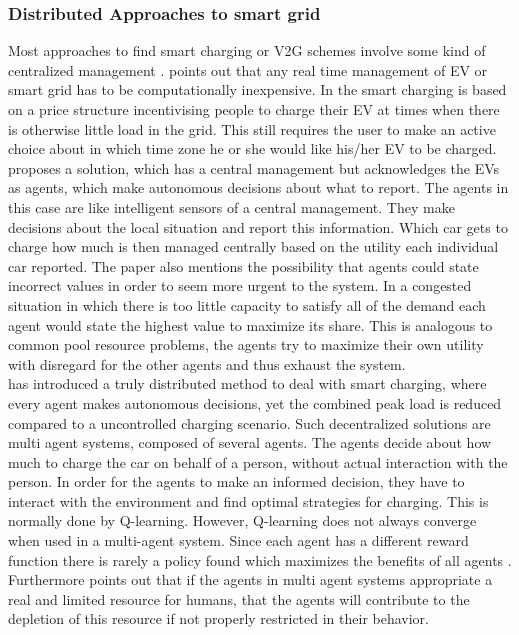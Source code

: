 \documentclass[a4paper]{article}
\begin{document}
\subsubsection{Distributed Approaches to smart grid}
Most approaches to find smart charging or V2G schemes involve some kind of centralized management \cite{realtime}\cite{ACDC}\cite{eth}. 
\cite{realtime} points out that any real time
management of EV or smart grid has to be computationally inexpensive. In \cite{realtime} the smart charging is based on a price structure 
incentivising people to charge their EV at times 
when there is otherwise little load in the grid. This still requires the user to make an active choice about in which time zone he or she 
would like his/her EV to be charged. \\
\cite{eth} proposes a solution, which has a central management but acknowledges the EVs as agents, which 
make autonomous decisions about what to report. The agents in this case are like intelligent sensors of a central management. They 
make decisions about the local situation and report this information. 
Which car gets to charge how much is then managed centrally based on the utility each individual car reported. 
The paper also 
mentions the possibility that agents could state incorrect values in order to seem more urgent to the system. In a congested situation 
in which there is too little capacity to satisfy
all of the demand each agent would state the highest value to maximize its share. This is analogous to common pool resource problems, 
the agents try to maximize their own utility with disregard for the other agents and thus exhaust the system.\\
\cite{reinforce_money} has introduced a truly distributed method to deal with smart charging, where every agent makes autonomous 
decisions, yet the combined peak load is reduced compared
to a uncontrolled charging scenario.
Such decentralized solutions are multi agent systems, composed of several agents. The agents decide about how much to charge the car on behalf of
a person, without actual interaction with the person. In order for the agents to make an informed decision, they have to interact 
with the environment and find optimal strategies for charging. This is normally done by Q-learning. However, Q-learning does not always 
converge when used in a multi-agent system. 
Since each agent has a different reward function there is rarely a policy found which maximizes the benefits of all agents \cite{qfail}. 
Furthermore \cite{ai_cpr} points out that if the agents in multi agent systems appropriate a real and limited resource for humans, that 
the agents will contribute to the depletion of this resource if not properly restricted in their behavior. 
\end{document}
